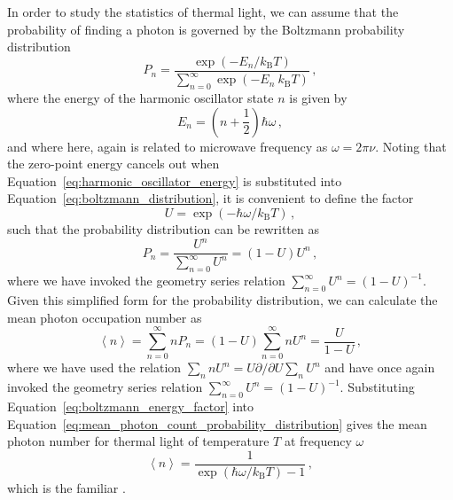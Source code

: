 In order to study the statistics of thermal light, we can assume that the probability of finding a photon is governed by the Boltzmann probability distribution
\begin{equation}
    P_{n} = \frac{\exp \left( - E_{n} / k_{\mathrm{B}} T \right)}{\sum_{n = 0}^{\infty} \exp \left( - E_{n} \ k_{\mathrm{B}} T \right)} \, ,
    \label{eq:boltzmann_distribution}
\end{equation}
where the energy of the harmonic oscillator state $n$ is given by
\begin{equation}
    E_{n} = \left( n + \frac{1}{2} \right) \hbar \omega \, ,
    \label{eq:harmonic_oscillator_energy}
\end{equation}
and where here, again is related to microwave frequency as $\omega = 2 \pi \nu$. Noting that the zero-point energy cancels out when Equation~\ref{eq:harmonic_oscillator_energy} is substituted into Equation~\ref{eq:boltzmann_distribution}, it is convenient to define the factor 
\begin{equation}
    U = \exp \left(- \hbar \omega / k_{\mathrm{B}} T \right) \, ,
    \label{eq:boltzmann_energy_factor}
\end{equation}
such that the probability distribution can be rewritten as 
\begin{equation}
    P_{n} = \frac{U^{n}}{\sum_{n = 0}^{\infty} U^{n}} = \left( 1 - U \right) U^{n} \, ,
    \label{eq:boltzmann_probability_simplified}
\end{equation}
where we have invoked the geometry series relation $\sum_{n = 0}^{\infty} U^{n} = (1 - U)^{-1}$. Given this simplified form for the probability distribution, we can calculate the mean photon occupation number as
\begin{equation}
    \left< n \right> = \sum_{n = 0}^{\infty} n P_{n} = \left( 1 - U \right) \sum_{n = 0}^{\infty} n U^{n} = \frac{U}{1 - U} \, ,
    \label{eq:mean_photon_count_probability_distribution}
\end{equation}
where we have used the relation $\sum_{n} n U^{n} = U \partial / \partial U \sum_{n} U^{n}$ and have once again invoked the geometry series relation $\sum_{n = 0}^{\infty} U^{n} = (1 - U)^{-1}$. Substituting Equation~\ref{eq:boltzmann_energy_factor} into Equation~\ref{eq:mean_photon_count_probability_distribution} gives the mean photon number for thermal light of temperature $T$ at frequency $\omega$
\begin{equation}
    \left< n \right> = \frac{1}{\exp \left( \hbar \omega / k_{\mathrm{B}} T \right) - 1} \, ,
    \label{eq:photon_occupation_number}
\end{equation}
which is the familiar .

